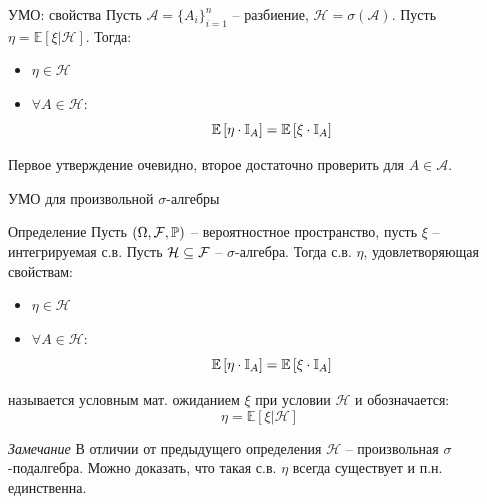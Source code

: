 \documentclass{beamer}
\begin{document}
\begin{frame}{УМО: свойства}
    Пусть $\mathcal{A} = \{A_i\}_{i=1}^n$ -- разбиение, $\mathcal{H} = \sigma(\mathcal{A})$. Пусть $\eta = \mathbb{E}\left[ \xi | \mathcal{H} \right]$. Тогда:
    \begin{itemize}
        \item $\eta \in \mathcal{H}$
        \item $\forall A\in \mathcal{H}$:
        $$
            \mathbb{E} \left[ \eta \cdot \mathbb{I}_{A} \right] = \mathbb{E} \left[ \xi \cdot \mathbb{I}_A \right]
        $$
    \end{itemize}
    Первое утверждение очевидно, второе достаточно проверить для $A\in \mathcal{A}$.
\end{frame}

\begin{frame}{УМО для произвольной $\sigma$-алгебры}
    \begin{block}{Определение}
        Пусть $(\Omega, \mathcal{F}, \mathbb{P})$ -- вероятностное пространство, пусть $\xi$ -- интегрируемая с.в. Пусть $\mathcal{H} \subseteq \mathcal{F}$ -- $\sigma$-алгебра. Тогда с.в. $\eta$, удовлетворяющая свойствам:
    \begin{itemize}
        \item $\eta \in \mathcal{H}$
        \item $\forall A\in \mathcal{H}$:
        $$
            \mathbb{E} \left[ \eta \cdot \mathbb{I}_{A} \right] = \mathbb{E} \left[ \xi \cdot \mathbb{I}_A \right]
        $$
    \end{itemize} называется условным мат. ожиданием $\xi$ при условии $\mathcal{H}$ и обозначается:
    $$
        \eta = \mathbb{E}\left[ \xi | \mathcal{H} \right]
    $$
    \end{block}
    \textit{Замечание} 
    В отличии от предыдущего определения $\mathcal{H}$ -- произвольная $\sigma$-подалгебра. Можно доказать, что такая с.в. $\eta$ всегда существует и п.н. единственна.
\end{frame}
\end{document}
